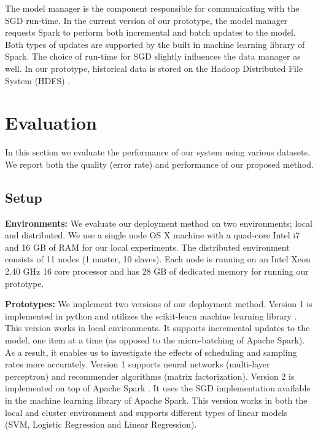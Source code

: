 \documentclass{vldb}
\begin{document}
The model manager is the component responsible for communicating with the SGD run-time.
In the current version of our prototype, the model manager requests Spark to perform both incremental and batch updates to the model.
Both types of updates are supported by the built in machine learning library of Spark.
The choice of run-time for SGD slightly influences the data manager as well.
In our prototype, historical data is stored on the Hadoop Distributed File System (HDFS) \cite{shvachko2010hadoop}.

\section{Evaluation} \label{evaluation} 
In this section we evaluate the performance of our system using various datasets. 
We report both the quality (error rate) and performance of our proposed method. 

\subsection{Setup}\label{subsec:setup}
\textbf{Environments:} We evaluate our deployment method on two environments; local and distributed.
We use a single node OS X machine with  a quad-core Intel i7 and 16 GB of RAM for our local experiments.
The distributed environment consists of 11 nodes (1 master, 10 slaves).
Each node is running on an Intel Xeon 2.40 GHz 16 core processor and has 28 GB of dedicated memory for running our prototype.

\textbf{Prototypes:} We implement two versions of our deployment method.
Version 1 is implemented in python and utilizes the scikit-learn machine learning library \cite{sklearn_api}.
This version works in local environments.
It supports incremental updates to the model, one item at a time (as opposed to the micro-batching of Apache Spark).
As a result, it enables us to investigate the effects of scheduling and sampling rates more accurately.
Version 1 supports neural networks (multi-layer perceptron) and recommender algorithms (matrix factorization).
Version 2 is implemented on top of Apache Spark \cite{zaharia2010spark}.
It uses the SGD implementation available in the machine learning library of Apache Spark.
This version works in both the local and cluster environment and supports different types of linear models (SVM, Logistic Regression and Linear Regression).
\end{document}
